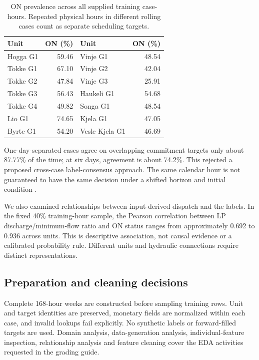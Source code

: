 \documentclass[a4paper,11pt]{article}
\begin{document}
\begin{table}[ht]
\centering
\begin{tabular}{lr@{\qquad}lr}
\hline
Unit & ON (\%) & Unit & ON (\%)\\\hline
Hogga G1 & 59.46 & Vinje G1 & 48.54\\
Tokke G1 & 67.10 & Vinje G2 & 42.04\\
Tokke G2 & 47.84 & Vinje G3 & 25.91\\
Tokke G3 & 56.43 & Haukeli G1 & 54.68\\
Tokke G4 & 49.82 & Songa G1 & 48.54\\
Lio G1 & 74.65 & Kjela G1 & 47.05\\
Byrte G1 & 54.20 & Vesle Kjela G1 & 46.69\\\hline
\end{tabular}
\caption{ON prevalence across all supplied training case-hours. Repeated physical hours in different rolling cases count as separate scheduling targets.}\label{prevalence}
\end{table}

One-day-separated cases agree on overlapping commitment targets only about 87.77\% of the time; at six days, agreement is about 74.2\%. This rejected a proposed cross-case label-consensus approach. The same calendar hour is not guaranteed to have the same decision under a shifted horizon and initial condition \cite{supplied}.

We also examined relationships between input-derived dispatch and the labels. In the fixed 40\% training-hour sample, the Pearson correlation between LP discharge/minimum-flow ratio and ON status ranges from approximately 0.692 to 0.936 across units. This is descriptive association, not causal evidence or a calibrated probability rule. Different units and hydraulic connections require distinct representations.

\subsection*{Preparation and cleaning decisions}
Complete 168-hour weeks are constructed before sampling training rows. Unit and target identities are preserved, monetary fields are normalized within each case, and invalid lookups fail explicitly. No synthetic labels or forward-filled targets are used. Domain analysis, data-generation analysis, individual-feature inspection, relationship analysis and feature cleaning cover the EDA activities requested in the grading guide.
\end{document}
